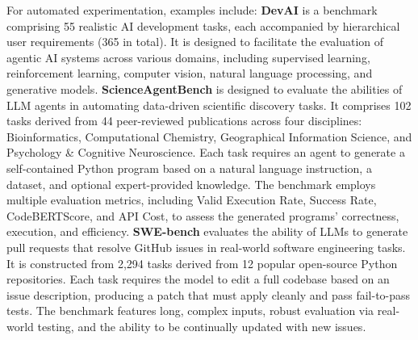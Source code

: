     For automated experimentation, examples include:
    \textbf{DevAI} \cite{zhuge2024agent} is a benchmark comprising 55 realistic AI development tasks, each accompanied by hierarchical user requirements (365 in total). It is designed to facilitate the evaluation of agentic AI systems across various domains, including supervised learning, reinforcement learning, computer vision, natural language processing, and generative models.
    \textbf{ScienceAgentBench} \cite{chen2024scienceagentbenchrigorousassessmentlanguage} is designed to evaluate the abilities of LLM agents in automating data-driven scientific discovery tasks. It comprises 102 tasks derived from 44 peer-reviewed publications across four disciplines: Bioinformatics, Computational Chemistry, Geographical Information Science, and Psychology \& Cognitive Neuroscience. Each task requires an agent to generate a self-contained Python program based on a natural language instruction, a dataset, and optional expert-provided knowledge. The benchmark employs multiple evaluation metrics, including Valid Execution Rate, Success Rate, CodeBERTScore, and API Cost, to assess the generated programs' correctness, execution, and efficiency.
    \textbf{SWE-bench} \cite{jimenez2024swebench} evaluates the ability of LLMs to generate pull requests that resolve GitHub issues in real-world software engineering tasks. It is constructed from 2,294 tasks derived from 12 popular open-source Python repositories.  %
    Each task requires the model to edit a full codebase based on an issue description, producing a patch that must apply cleanly and pass fail-to-pass tests. The benchmark features long, complex inputs, robust evaluation via real-world testing, and the ability to be continually updated with new issues.
\fi

   


